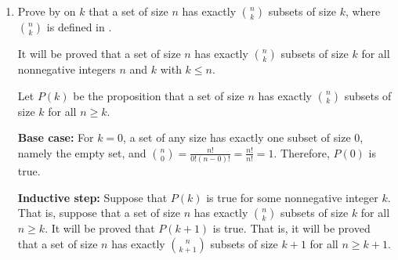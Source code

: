 \begin{enumerate}
\begin{subprove}
    Let \(S\) be a set with \(k+1\) elements, and let \(x \in S\).
    Consider the set \(S' = S \setminus \{x\}\), which has \(k\) elements.
    By the inductive hypothesis, \(S'\) has exactly \(2^{k}\) subsets.
    The subsets of \(S\) can be partitioned into two classes: those that do not contain \(x\) and those that do contain \(x\).
    The subsets that do not contain \(x\) are exactly the subsets of \(S'\), so there are \(2^{k}\) of them.
    The subsets that do contain \(x\) are of the form \(A \cup \{x\}\), where \(A\) is a subset of \(S'\), so there are also \(2^{k}\) of them.
    Therefore, the total number of subsets of \(S\) is \(2^{k} + 2^{k} = 2 \cdot 2^{k} = 2^{k+1}\).
    
    Therefore, \(P(k+1)\) is true.
    
    By , it follows that \(P(n)\) is true for all nonnegative integers \(n\).
  \end{subprove}
  \item Prove by  on \(k\) that a set of size \(n\) has exactly \(\binom{n}{k}\) subsets of size \(k\), where \(\binom{n}{k}\) is defined in .
  \begin{subprove}
    It will be proved that a set of size \(n\) has exactly \(\binom{n}{k}\) subsets of size \(k\) for all nonnegative integers \(n\) and \(k\) with \(k \leq n\).
    
    Let \(P(k)\) be the proposition that a set of size \(n\) has exactly \(\binom{n}{k}\) subsets of size \(k\) for all \(n \geq k\).
    
    \textbf{Base case:} For \(k = 0\), a set of any size has exactly one subset of size \(0\), namely the empty set, and \(\binom{n}{0} = \frac{n!}{0!(n-0)!} = \frac{n!}{n!} = 1\).
    Therefore, \(P(0)\) is true.
    
    \textbf{Inductive step:} Suppose that \(P(k)\) is true for some nonnegative integer \(k\).
    That is, suppose that a set of size \(n\) has exactly \(\binom{n}{k}\) subsets of size \(k\) for all \(n \geq k\).
    It will be proved that \(P(k+1)\) is true.
    That is, it will be proved that a set of size \(n\) has exactly \(\binom{n}{k+1}\) subsets of size \(k+1\) for all \(n \geq k+1\).
    

\end{subprove}
\end{enumerate}
